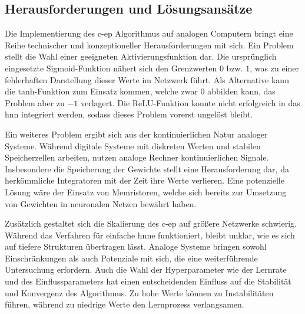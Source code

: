 \subsection{Herausforderungen und Lösungsansätze}

Die Implementierung des \ac{c-ep} Algorithmus auf analogen Computern bringt eine Reihe technischer und konzeptioneller Herausforderungen mit sich. Ein Problem stellt die Wahl einer geeigneten Aktivierungsfunktion dar. Die ursprünglich eingesetzte Sigmoid-Funktion nähert sich den Grenzwerten \(0\) bzw. \(1\), was zu einer fehlerhaften Darstellung dieser Werte im Netzwerk führt. Als Alternative kann die tanh-Funktion zum Einsatz kommen, welche zwar \(0\) abbilden kann, das Problem aber zu \(-1\) verlagert. Die ReLU-Funktion konnte nicht erfolgreich in das \ac{hnn} integriert werden, sodass dieses Problem vorerst ungelöst bleibt.

Ein weiteres Problem ergibt sich aus der kontinuierlichen Natur analoger Systeme. Während digitale Systeme mit diskreten Werten und stabilen Speicherzellen arbeiten, nutzen analoge Rechner kontinuierlichen Signale. Insbesondere die Speicherung der Gewichte stellt eine Herausforderung dar, da herkömmliche Integratoren mit der Zeit ihre Werte verlieren. Eine potenzielle Lösung wäre der Einsatz von Memristoren, welche sich bereits zur Umsetzung von Gewichten in neuronalen Netzen bewährt haben.

Zusätzlich gestaltet sich die Skalierung des \ac{c-ep} auf größere Netzwerke schwierig. Während das Verfahren für einfache \ac{hnn}e funktioniert, bleibt unklar, wie es sich auf tiefere Strukturen übertragen lässt. Analoge Systeme bringen sowohl Einschränkungen als auch Potenziale mit sich, die eine weiterführende Untersuchung erfordern. Auch die Wahl der Hyperparameter wie der Lernrate und des Einflussparameters hat einen entscheidenden Einfluss auf die Stabilität und Konvergenz des Algorithmus. Zu hohe Werte können zu Instabilitäten führen, während zu niedrige Werte den Lernprozess verlangsamen.
